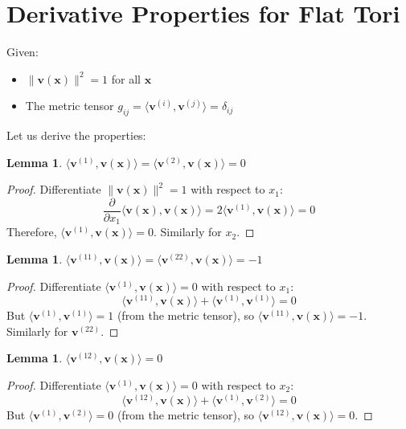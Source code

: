 \documentclass{article}
\def\vv{{\bm{v}}}
\def\vx{{\bm{x}}}
\def\evx{{x}}
\newtheorem{lemma}[theorem]{Lemma}
\begin{document}
\section{Derivative Properties for Flat Tori}
\label{sec:derivatives} 

Given: 
\begin{itemize}
\item $\|\vv(\vx)\|^2 = 1$ for all $\vx$
\item The metric tensor $g_{ij} = \langle \vv^{(i)}, \vv^{(j)} \rangle = \delta_{ij}$
\end{itemize}

Let us derive the properties:

\begin{lemma}
$\langle \vv^{(1)}, \vv(\vx) \rangle = \langle \vv^{(2)}, \vv(\vx) \rangle = 0$
\end{lemma}

\begin{proof}
Differentiate $\|\vv(\vx)\|^2 = 1$ with respect to $\evx_1$:
\[
\frac{\partial}{\partial \evx_1} \langle \vv(\vx), \vv(\vx) \rangle = 2\langle \vv^{(1)}, \vv(\vx) \rangle = 0
\]
Therefore, $\langle \vv^{(1)}, \vv(\vx) \rangle = 0$. Similarly for $\evx_2$.
\end{proof}

\begin{lemma}
$\langle \vv^{(11)}, \vv(\vx) \rangle = \langle \vv^{(22)}, \vv(\vx) \rangle = -1$
\end{lemma}

\begin{proof}
Differentiate $\langle \vv^{(1)}, \vv(\vx) \rangle = 0$ with respect to $\evx_1$:
\[
\langle \vv^{(11)}, \vv(\vx) \rangle + \langle \vv^{(1)}, \vv^{(1)} \rangle = 0
\]
But $\langle \vv^{(1)}, \vv^{(1)} \rangle = 1$ (from the metric tensor), so $\langle \vv^{(11)}, \vv(\vx) \rangle = -1$.
Similarly for $\vv^{(22)}$.
\end{proof}

\begin{lemma}
$\langle \vv^{(12)}, \vv(\vx) \rangle = 0$
\end{lemma}

\begin{proof}
Differentiate $\langle \vv^{(1)}, \vv(\vx) \rangle = 0$ with respect to $\evx_2$:
\[
\langle \vv^{(12)}, \vv(\vx) \rangle + \langle \vv^{(1)}, \vv^{(2)} \rangle = 0
\]
But $\langle \vv^{(1)}, \vv^{(2)} \rangle = 0$ (from the metric tensor), so $\langle \vv^{(12)}, \vv(\vx) \rangle = 0$.
\end{proof}
\end{document}
